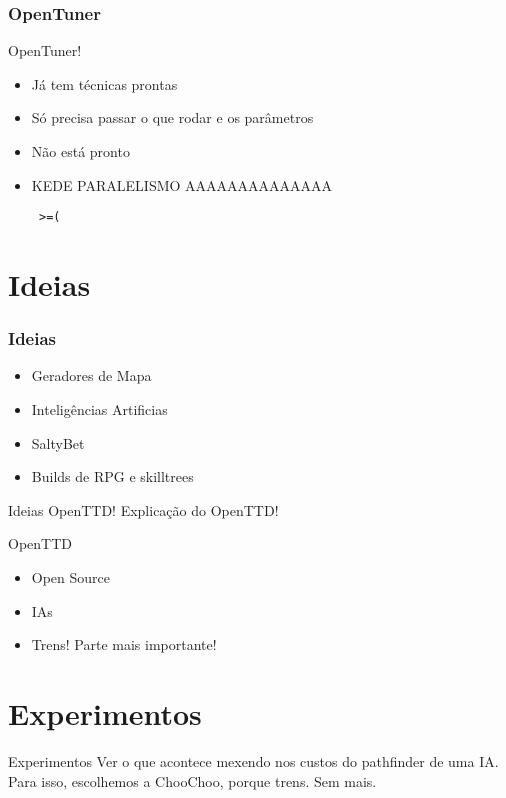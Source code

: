 \documentclass[10pt]{beamer}
\begin{document}
\begin{frame}[fragile]
  \frametitle{OpenTuner}
      OpenTuner!
      \pause
	  \begin{itemize}[<+- | alert@+>]
		\item Já tem técnicas prontas
		\item Só precisa passar o que rodar e os parâmetros
		\item Não está pronto
		\item KEDE PARALELISMO AAAAAAAAAAAAAA \begin{verbatim} >=(\end{verbatim}
		
	  \end{itemize}  
\end{frame}

\section{Ideias}

\begin{frame}[fragile]
  \frametitle{Ideias}
	  \begin{itemize}
	  	\item Geradores de Mapa
	  	\item Inteligências Artificias
	  	\item SaltyBet
	  	\item Builds de RPG e skilltrees
	  \end{itemize}
\end{frame}

\begin{frame}{Ideias}
	OpenTTD!
	\pause
	Explicação do OpenTTD!
\end{frame}

\begin{frame}{OpenTTD}	
	\begin{itemize}	[<+- | alert@+>]
		\item Open Source
		\item IAs
		\item Trens! Parte mais importante!
	\end{itemize}
\end{frame}

\section{Experimentos}
\begin{frame}{Experimentos}
	Ver o que acontece mexendo nos custos do pathfinder de uma IA.\pause\\
	Para isso, escolhemos a ChooChoo, porque trens. Sem mais.
\end{frame}
\end{document}
